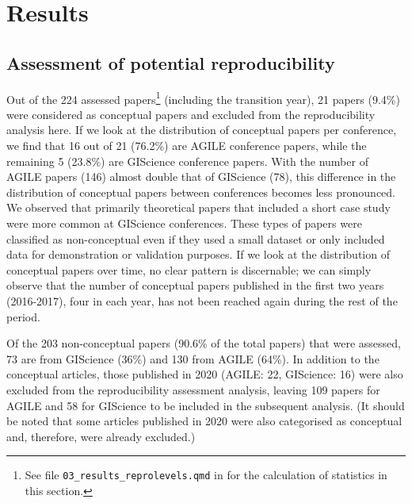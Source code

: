 \documentclass{josis}
\begin{document}
\section{Results}
\label{sec:results}

\subsection{Assessment of potential reproducibility}
\label{sec:results:assessment}



Out of the 224 assessed papers\footnote{See file \texttt{03\_results\_reprolevels.qmd} in \cite{data} for the calculation of statistics in this section.} (including the transition year), 21 papers (9.4\%) were considered as conceptual papers and excluded from the reproducibility analysis here. 
If we look at the distribution of conceptual papers per conference, we find that 16 out of 21 (76.2\%) are AGILE conference papers, while the remaining 5 (23.8\%) are GIScience conference papers.
With the number of AGILE papers (146) almost double that of GIScience (78), this difference in the distribution of conceptual papers between conferences becomes less pronounced.
We observed that primarily theoretical papers that included a short case study were more common at GIScience conferences.
These types of papers were classified as non-conceptual even if they used a small dataset or only included data for demonstration or validation purposes.
If we look at the distribution of conceptual papers over time, no clear pattern is discernable; we can simply observe that the number of conceptual papers published in the first two years (2016-2017), four in each year, has not been reached again during the rest of the period.

Of the 203 non-conceptual papers (90.6\% of the total papers) that were assessed, 73 are from GIScience (36\%) and 130 from AGILE (64\%).
In addition to the conceptual articles, those published in 2020 (AGILE: 22, GIScience: 16) were also excluded from the reproducibility assessment analysis, leaving 109 papers for AGILE and 58 for GIScience to be included in the subsequent analysis. (It should be noted that some articles published in 2020 were also categorised as conceptual and, therefore, were already excluded.)
\end{document}

